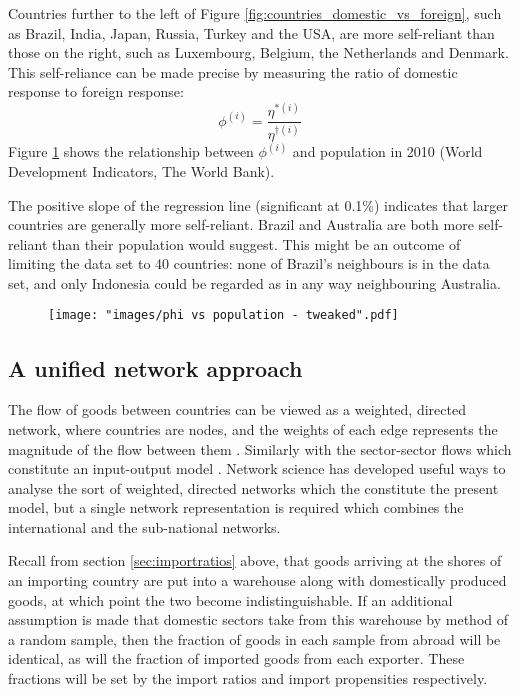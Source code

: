 \documentclass[a4paper]{article}
\begin{document}
Countries further to the left of Figure \ref{fig:countries_domestic_vs_foreign}, such as Brazil, India, Japan, Russia, Turkey and the USA, are more self-reliant than those on the right, such as Luxembourg, Belgium, the Netherlands and Denmark.
This self-reliance can be made precise by measuring the ratio of domestic response to foreign response:
\begin{equation}
\phi^{(i)} = \frac{\eta^{*(i)}}{\eta^{\dagger(i)}}
\end{equation}
Figure \ref{fig:phi-vs-pop} shows the relationship between $\phi^{(i)}$ and population in 2010 (World Development Indicators, The World Bank).

The positive slope of the regression line (significant at 0.1\%) indicates that larger countries are generally more self-reliant.
Brazil and Australia are both more self-reliant than their population would suggest.
This might be an outcome of limiting the data set to 40 countries: none of Brazil's neighbours is in the data set, and only Indonesia could be regarded as in any way neighbouring Australia.

\begin{figure}
\centering
\texttt{[image: "images/phi vs population - tweaked".pdf]}
\caption{}
\label{fig:phi-vs-pop}
\end{figure}



\subsection*{A unified network approach}
The flow of goods between countries can be viewed as a weighted, directed network, where countries are nodes, and the weights of each edge represents the magnitude of the flow between them \parencite{Nystuen1961,Serrano2003,Bhattacharya2008,Baskaran2011}.
Similarly with the sector-sector flows which constitute an input-output model \parencite{Blochl2011}.
Network science has developed useful ways to analyse the sort of weighted, directed networks which the constitute the present model, but a single network representation is required which combines the international and the sub-national networks.

Recall from section \ref{sec:importratios} above, that goods arriving at the shores of an importing country are put into a warehouse along with domestically produced goods, at which point the two become indistinguishable.
If an additional assumption is made that domestic sectors take from this warehouse by method of a random sample, then the fraction of goods in each sample from abroad will be identical, as will the fraction of imported goods from each exporter.
These fractions will be set by the import ratios and import propensities respectively.
\end{document}
